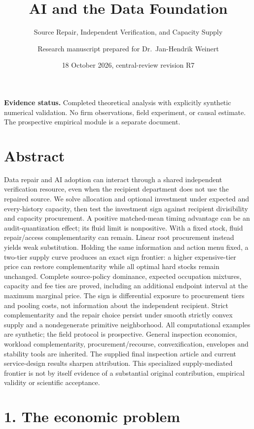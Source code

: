 \documentclass[
  11pt,
  a4paper,
]{article}
\title{AI and the Data Foundation}
\subtitle{Source Repair, Independent Verification, and Capacity Supply}
\author{Research manuscript prepared for Dr.~Jan-Hendrik Weinert}
\date{18 October 2026, central-review revision R7}
\begin{document}
\maketitle

\textbf{Evidence status.} Completed theoretical analysis with explicitly
synthetic numerical validation. No firm observations, field experiment,
or causal estimate. The prospective empirical module is a separate
document.

\hypertarget{abstract}{%
\section{Abstract}\label{abstract}}

Data repair and AI adoption can interact through a shared independent
verification resource, even when the recipient department does not use
the repaired source. We solve allocation and optional investment under
expected and every-history capacity, then test the investment sign
against recipient divisibility and capacity procurement. A positive
matched-mean timing advantage can be an audit-quantization effect; its
fluid limit is nonpositive. With a fixed stock, fluid repair/access
complementarity can remain. Linear root procurement instead yields weak
substitution. Holding the same information and action menu fixed, a
two-tier supply curve produces an exact sign frontier: a higher
expensive-tier price can restore complementarity while all optimal hard
stocks remain unchanged. Complete source-policy dominance, expected
occupation mixtures, capacity and fee ties are proved, including an
additional endpoint interval at the maximum marginal price. The sign is
differential exposure to procurement tiers and pooling costs, not
information about the independent recipient. Strict complementarity and
the repair choice persist under smooth strictly convex supply and a
nondegenerate primitive neighborhood. All computational examples are
synthetic; the field protocol is prospective. General inspection
economics, workload complementarity, procurement/recourse,
convexification, envelopes and stability tools are inherited. The
supplied final inspection article and current service-design results
sharpen attribution. This specialized supply-mediated frontier is not by
itself evidence of a substantial original contribution, empirical
validity or scientific acceptance.

\hypertarget{the-economic-problem}{%
\section{1. The economic problem}\label{the-economic-problem}}
\end{document}
